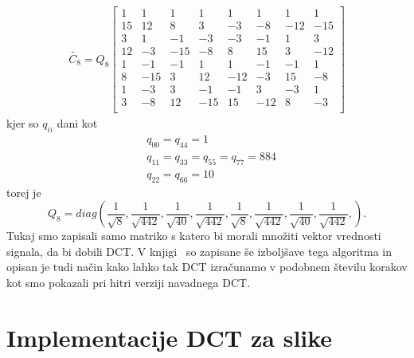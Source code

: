 \documentclass[a4paper,12pt,openright]{book}
\begin{document}
\begin{gather}
   \widetilde{C_8} = Q_8
 \begin{bmatrix}
    1&    1&   1&    1&   1&   1&    1&   1\\
    15&  12&   8&    3&  -3&  -8&  -12& -15\\
    3&    1&  -1&   -3&  -3&  -1&   1&    3\\
    12&  -3& -15&   -8&   8&  15&   3&  -12\\
    1&   -1&  -1&    1&   1&  -1&  -1&    1\\
    8&  -15&   3&   12& -12&  -3&  15&   -8\\
    1&   -3&   3&   -1&  -1&   3&  -3&    1\\
    3&   -8&   12& -15&  15& -12&   8&   -3\\
 \end{bmatrix}
\label{eq:IntegerDCT_8(15, 12, 8, 3, 3, 1, 1)}
\end{gather}
kjer so $q_{ii}$ dani kot
\begin{equation}
  \begin{aligned}
    &q_{00} = q_{44} = 1\\
    &q_{11} = q_{33} = q_{55} = q_{77} = 884\\
    &q_{22} = q_{66} = 10
  \end{aligned}
\end{equation}
torej je
\begin{equation}
    Q_8 = diag\left(\frac{1}{\sqrt{8}}, \frac{1}{\sqrt{442}},\frac{1}{\sqrt{40}},\frac{1}{\sqrt{442}},\frac{1}{\sqrt{8}},\frac{1}{\sqrt{442}},\frac{1}{\sqrt{40}},\frac{1}{\sqrt{442}}, \right).
\end{equation}
Tukaj smo zapisali samo matriko s katero bi morali množiti vektor vrednosti signala, da bi dobili DCT. V knjigi~\cite{britanak2010discrete} so zapisane še izboljšave tega algoritma in opisan je tudi način kako lahko tak DCT izračunamo v podobnem številu korakov kot smo pokazali pri hitri verziji navadnega DCT.















\chapter{Implementacije DCT za slike}
\label{ch2}
\end{document}
